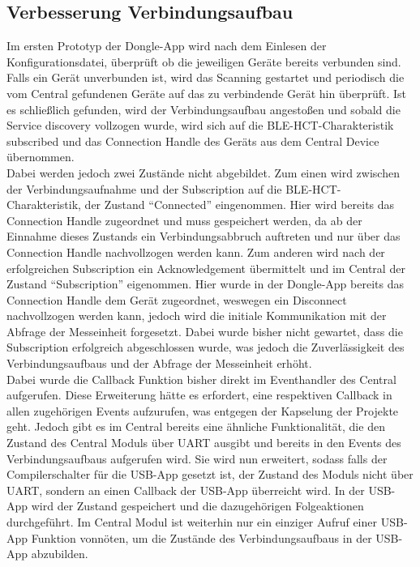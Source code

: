 \subsection{Verbesserung Verbindungsaufbau}
Im ersten Prototyp der Dongle-App wird nach dem Einlesen der Konfigurationsdatei, überprüft ob die jeweiligen Geräte bereits verbunden sind. Falls ein Gerät unverbunden ist, wird das Scanning gestartet und periodisch die vom Central gefundenen Geräte auf das zu verbindende Gerät hin überprüft. Ist es schließlich gefunden, wird der Verbindungsaufbau angestoßen und sobald die Service discovery vollzogen wurde, wird sich auf die \ac{BLE}-\ac{HCT}-Charakteristik subscribed und das Connection Handle des Geräts aus dem Central Device übernommen. \\
Dabei werden jedoch zwei Zustände nicht abgebildet. Zum einen wird zwischen der Verbindungsaufnahme und der Subscription auf die \ac{BLE}-\ac{HCT}-Charakteristik, der Zustand ``Connected'' eingenommen. Hier wird bereits das Connection Handle zugeordnet und muss gespeichert werden, da ab der Einnahme dieses Zustands ein Verbindungsabbruch auftreten und nur über das Connection Handle nachvollzogen werden kann. Zum anderen wird nach der erfolgreichen Subscription ein Acknowledgement übermittelt und im Central der Zustand ``Subscription'' eigenommen. Hier wurde in der Dongle-App bereits das Connection Handle dem Gerät zugeordnet, weswegen ein Disconnect nachvollzogen werden kann, jedoch wird die initiale Kommunikation mit der Abfrage der Messeinheit forgesetzt. Dabei wurde bisher nicht gewartet, dass die Subscription erfolgreich abgeschlossen wurde, was jedoch die Zuverlässigkeit des Verbindungsaufbaus und der Abfrage der Messeinheit erhöht.\\
Dabei wurde die Callback Funktion bisher direkt im Eventhandler des Central aufgerufen. Diese Erweiterung hätte es erfordert, eine respektiven Callback in allen zugehörigen Events aufzurufen, was entgegen der Kapselung der Projekte geht. Jedoch gibt es im Central bereits eine ähnliche Funktionalität, die den Zustand des Central Moduls über UART ausgibt und bereits in den Events des Verbindungsaufbaus aufgerufen wird. Sie wird nun erweitert, sodass falls der Compilerschalter für die \ac{USB}-App gesetzt ist, der Zustand des Moduls nicht über UART, sondern an einen Callback der \ac{USB}-App überreicht wird. In der \ac{USB}-App wird der Zustand gespeichert und die dazugehörigen Folgeaktionen durchgeführt. Im Central Modul ist weiterhin nur ein einziger Aufruf einer \ac{USB}-App Funktion vonnöten, um die Zustände des Verbindungsaufbaus in der \ac{USB}-App abzubilden.

